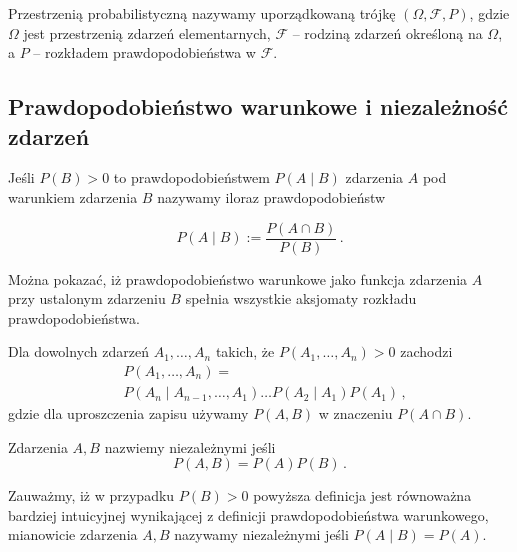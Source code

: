 \documentclass{myclass}
\numberwithin{equation}{subsection}
\begin{document}
\begin{definition}
Przestrzenią probabilistyczną nazywamy uporządkowaną trójkę \((\Omega, \mathcal{F}, P)\), gdzie
\(\Omega\) jest przestrzenią zdarzeń elementarnych, \(\mathcal{F}\) -- rodziną zdarzeń określoną na
\(\Omega\), a \(P\) -- rozkładem prawdopodobieństwa w \(\mathcal{F}\).
\end{definition}


\subsection{Prawdopodobieństwo warunkowe i niezależność zdarzeń}

\begin{definition}
Jeśli \(P(B) > 0\) to prawdopodobieństwem \(P(A \mid B)\) zdarzenia \(A\) pod warunkiem zdarzenia
\(B\) nazywamy iloraz prawdopodobieństw

\begin{equation*}
    P(A \mid B) := \frac{P(A \cap B)}{ P(B)}\,.
\end{equation*}
\end{definition}

Można pokazać, iż prawdopodobieństwo warunkowe jako funkcja zdarzenia \(A\) przy ustalonym zdarzeniu
\(B\) spełnia wszystkie aksjomaty rozkładu prawdopodobieństwa.

\begin{theorem}
Dla dowolnych zdarzeń \(A_1,\ldots,A_n\) takich, że \(P(A_1,\ldots,A_n) > 0\) zachodzi
\begin{equation*}
    \begin{split}
        &P(A_1,\ldots,A_n) =\\
        &P(A_n \mid A_{n-1},\ldots,A_1) \ldots P(A_2 \mid A_1) P(A_1)\,,
    \end{split}
\end{equation*}
gdzie dla uproszczenia zapisu używamy \(P(A,B)\) w znaczeniu \(P(A \cap B)\).
\end{theorem}

\begin{definition}
Zdarzenia \(A, B\) nazwiemy niezależnymi jeśli
\begin{equation*}
    P(A, B) = P(A) P(B)\,.
\end{equation*}
\end{definition}

Zauważmy, iż w przypadku \(P(B) > 0\) powyższa definicja jest równoważna bardziej intuicyjnej
wynikającej z definicji prawdopodobieństwa warunkowego, mianowicie zdarzenia \(A,B\) nazywamy
niezależnymi jeśli \(P(A \mid B) = P(A)\).
\end{document}
